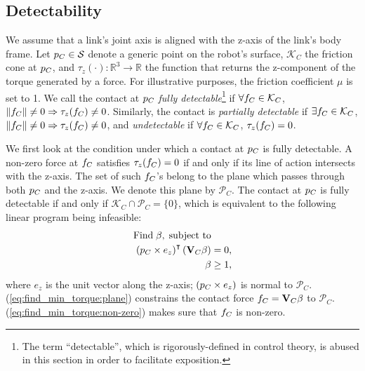 \subsection{Detectability}
We assume that a link's joint axis is aligned with the z-axis of the link's body frame. Let ${p}_C \in \mathcal{S}$ denote a generic point on the robot's surface, $\mathcal{K}_C$ the friction cone at ${p}_C$, and $\tau_z(\cdot): \mathbb{R}^3 \rightarrow \mathbb{R}$ the function that returns the z-component of the torque generated by a force. For illustrative purposes, the friction coefficient $\mu$ is set to 1. We call the contact at ${p}_C$ \textit{fully detectable}\footnote{The term ``detectable'', which is rigorously-defined in control theory, is abused in this section in order to facilitate exposition.} if $\forall {f}_C \in \mathcal{K}_C$, $\left\lVert{{f}_C}\right\rVert \neq 0 \Rightarrow \tau_z({f}_C) \neq 0$. Similarly, the contact is \textit{partially detectable} if $\exists {f}_C \in \mathcal{K}_C$,  $\left\lVert{{f}_C}\right\rVert \neq 0 \Rightarrow \tau_z({f}_C) \neq 0$, and \textit{undetectable} if $\forall {f}_C \in \mathcal{K}_C$, $\tau_z({f}_C) = 0$.

We first look at the condition under which a contact at ${p}_C$ is fully detectable. A non-zero force at ${f}_C$ satisfies $\tau_z({f}_C) = 0$ if and only if its line of action intersects with the z-axis. The set of such ${f}_C$'s belong to the plane which passes through both ${p}_C$ and the z-axis. We denote this plane by $\mathcal{P}_C$. The contact at ${p}_C$ is fully detectable if and only if $\mathcal{K}_C \cap \mathcal{P}_C = \{{0}\}$, which is equivalent to the following linear program being infeasible:
\begin{subequations}
\label{eq:find_min_torque}
\begin{align}
\text{Find} \; {\beta}, \; \text{subject to} &  \\
\left({p}_C \times {e}_z\right)^\intercal \left(\mathbf{V}_C {\beta} \right) &= 0, \label{eq:find_min_torque:plane}\\
{\beta} &\geq 1, \label{eq:find_min_torque:non-zero}
\end{align}
\end{subequations}
where ${e}_z$ is the unit vector along the z-axis; $({p}_C \times {e}_z)$ is normal to $\mathcal{P}_C$. (\ref{eq:find_min_torque:plane}) constrains the contact force ${f}_C = \mathbf{V}_C {\beta}$ to $\mathcal{P}_C$. (\ref{eq:find_min_torque:non-zero}) makes sure that ${f}_C$ is non-zero. 

